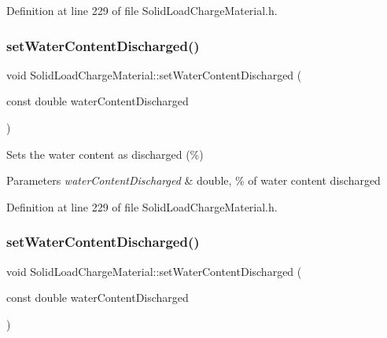 Definition at line 229 of file Solid\+Load\+Charge\+Material.\+h.

\mbox{\label{class_solid_load_charge_material_a5104ddb43af977a751b90a0bc844d83d}} 
\subsubsection{\texorpdfstring{set\+Water\+Content\+Discharged()}{setWaterContentDischarged()}\hspace{0.1cm}{\footnotesize\ttfamily [2/3]}}
{\footnotesize\ttfamily void Solid\+Load\+Charge\+Material\+::set\+Water\+Content\+Discharged (\begin{DoxyParamCaption}\item[{const double}]{water\+Content\+Discharged }\end{DoxyParamCaption})\hspace{0.3cm}{\ttfamily [inline]}}

Sets the water content as discharged (\%) 
\begin{DoxyParams}{Parameters}
{\em water\+Content\+Discharged} & double, \% of water content discharged \\
\hline
\end{DoxyParams}


Definition at line 229 of file Solid\+Load\+Charge\+Material.\+h.

\mbox{\label{class_solid_load_charge_material_a5104ddb43af977a751b90a0bc844d83d}} 
\subsubsection{\texorpdfstring{set\+Water\+Content\+Discharged()}{setWaterContentDischarged()}\hspace{0.1cm}{\footnotesize\ttfamily [3/3]}}
{\footnotesize\ttfamily void Solid\+Load\+Charge\+Material\+::set\+Water\+Content\+Discharged (\begin{DoxyParamCaption}\item[{const double}]{water\+Content\+Discharged }\end{DoxyParamCaption})\hspace{0.3cm}{\ttfamily [inline]}}


